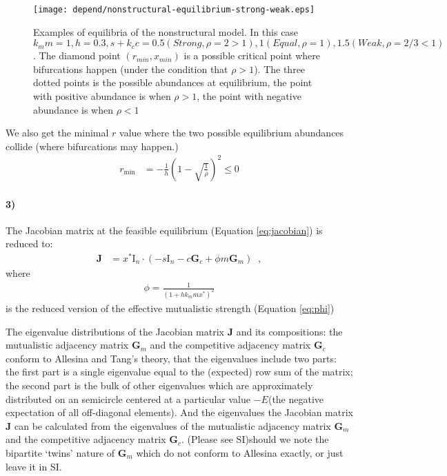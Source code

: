 \documentclass[a4paper,fleqn,12pt]{article}
\begin{document}
\begin{figure}[htbp]
\begin{center}
\texttt{[image: depend/nonstructural-equilibrium-strong-weak.eps]}
\end{center}
\caption{Examples of equilibria of the nonstructural model. In this case $k_mm = 1, h = 0.3, s+k_cc = 0.5(Strong, \rho = 2 > 1), 1(Equal, \rho = 1), 1.5(Weak, \rho = 2/3 < 1)$.
{\color{red}The diamond point $(r_{min}, x_{min})$ is a possible critical point where bifurcations happen (under the condition that $\rho > 1$). The three dotted points is the possible abundances at equilibrium, the point with positive abundance is when $\rho > 1$, the point with negative abundance is when $\rho < 1$}
}
\label{fig:nonstructural-equilibrium-strong-weak}
\end{figure}


We also get the minimal $r$ value where the two possible equilibrium abundances collide (where bifurcations may happen.)
\begin{align} \label{eq:rmin}
r_{\mathrm{min}} &= -\frac{1}{h} (1 - \sqrt{\frac{1}{\rho}})^2 \le 0
\end{align}

\paragraph*{3)} The Jacobian matrix at the feasible equilibrium (Equation \ref{eq:jacobian}) is reduced to:
\begin{align} \label{eq:jacobian-nonstructural}
\mathbf{J}
 &= x^*\mathrm{I}_n \cdot ( - s\mathrm{I}_n - c\mathbf{G}_c + \phi m \mathbf{G}_m ) \;\; , 
\end{align}
where
\begin{align} \label{eq:phi-nonstructural}
\phi = \frac{1}{(1+hk_m mx^*)^2} 
\end{align}
is the reduced version of the effective mutualistic strength (Equation \ref{eq:phi})

The eigenvalue distributions of the Jacobian matrix $\mathbf{J}$ and its compositions: the mutualistic adjacency matrix $\mathbf{G}_m$ and the competitive adjacency matrix $\mathbf{G}_c$ conform to Allesina and Tang's theory\cite{allesina_stability_2012,tang_correlation_2014,tang_reactivity_2014}, that 
the eigenvalues include two parts: 
the first part is a single eigenvalue equal to the (expected) row sum of the matrix; 
the second part is the bulk of other eigenvalues which are approximately distributed on an semicircle centered at a particular value $-E$(the negative expectation of all off-diagonal elements).
And the eigenvalues the Jacobian matrix $\mathbf{J}$ can be calculated from the eigenvalues of the mutualistic adjacency matrix $\mathbf{G}_m$ and the competitive adjacency matrix $\mathbf{G}_c$.
(Please see SI){\color{red}should we note the bipartite `twins' nature of $\mathbf{G}_m$ which do not conform to Allesina exactly, or just leave it in SI.}
\end{document}
